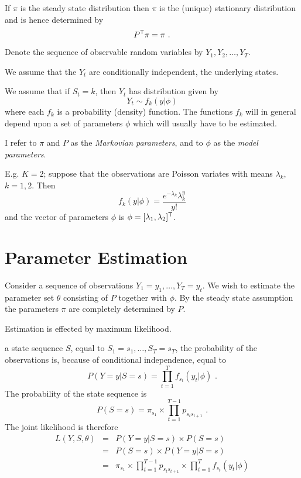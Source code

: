 If $\pi$ is the steady state distribution then $\pi$ is the (unique)
stationary distribution and is hence determined by
\[
P^{\mbox{\scriptsize \sf T}} \pi = \pi \mbox{ .}
\]

Denote the sequence of observable random variables by $Y_1, Y_2,
\ldots, Y_T$.

We assume that the $Y_t$ are conditionally independent, 
the underlying states.

We assume that if $S_t = k$, then $Y_t$ has distribution given by
\[
Y_t \sim f_k(y|\phi)
\]
where each $f_k$ is a probability (density) function.  The functions
$f_k$ will in general depend upon a set of parameters $\phi$ which
will usually have to be estimated.

I refer to $\pi$ and $P$ as the {\em Markovian parameters}, and to
$\phi$ as the {\em model parameters}.

E.g. $K=2$; suppose that the observations are Poisson variates
with means $\lambda_k$, $k = 1, 2$.  Then
\[
f_k(y|\phi) = \frac{e^{-\lambda_k} \lambda_k^y}{y!}
\]
and the vector of parameters $\phi$ is $\phi =
[\lambda_1, \lambda_2]^{\mbox{\scriptsize \sf T}}$.

\section{Parameter Estimation}

Consider a sequence of observations $Y_1=y_1, \ldots, Y_T=y_t$.  We
wish to estimate the parameter set $\theta$ consisting of $P$
together with $\phi$.  By the steady state assumption the parameters
$\pi$ are completely determined by $P$.

Estimation is effected by maximum likelihood.

 a state sequence $S$, equal to $S_1 = s_1, \ldots, S_T =
s_T$, the probability of the observations is, because of conditional
independence, equal to
\[
P(Y=y|S=s) = \prod_{t=1}^T f_{s_t}(y_t|\phi) \mbox{ .}
\]
The probability of the state sequence is
\[
P(S=s) = \pi_{s_1} \times \prod_{t=1}^{T-1} p_{s_t s_{t+1}} \mbox{ .}
\]
The joint likelihood is therefore
\begin{eqnarray*}
L(Y,S,\theta) & = & P(Y=y|S=s) \times P(S=s)\\
              & = & P(S=s) \times P(Y=y|S=s)\\
              & = & \pi_{s_1}  \times \prod_{t=1}^{T-1} p_{s_t s_{t+1}}
                \times \prod_{t=1}^T f_{s_t}(y_t|\phi)
\end{eqnarray*}

